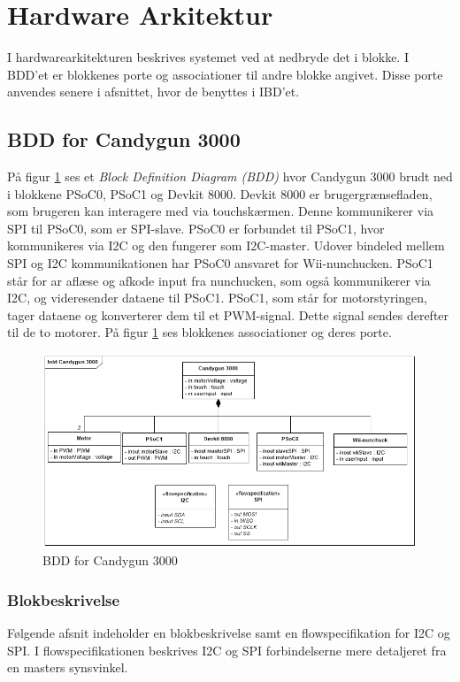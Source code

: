 \section{Hardware Arkitektur}
I hardwarearkitekturen beskrives systemet ved at nedbryde det i blokke. I BDD'et er blokkenes porte og associationer til andre blokke angivet. Disse porte anvendes senere i afsnittet, hvor de benyttes i IBD'et.

\subsection{BDD for Candygun 3000}
På figur \ref{fig:BDD} ses et \textit{Block Definition Diagram (BDD)} hvor Candygun 3000 brudt ned i blokkene PSoC0, PSoC1 og Devkit 8000. Devkit 8000 er brugergrænsefladen, som brugeren kan interagere med via touchskærmen. Denne kommunikerer via SPI til PSoC0, som er SPI-slave. PSoC0 er forbundet til PSoC1, hvor kommunikeres via I2C og den fungerer som I2C-master. Udover bindeled mellem SPI og I2C kommunikationen har  PSoC0 ansvaret for Wii-nunchucken. PSoC1 står for ar aflæse og afkode input fra nunchucken, som også kommunikerer via I2C, og videresender dataene til PSoC1. PSoC1, som står for motorstyringen, tager dataene og konverterer dem til et PWM-signal. Dette signal sendes derefter til de to motorer. På figur \ref{fig:BDD} ses blokkenes associationer og deres porte.  

\begin{figure}[H]
	\centering
	\includegraphics[width= \textwidth]{Systemarkitektur/images/BDD_overordnet.png}
	\caption{BDD for Candygun 3000}
	\label{fig:BDD}
\end{figure}


\subsubsection{Blokbeskrivelse}
Følgende afsnit indeholder en blokbeskrivelse samt en flowspecifikation for I2C og SPI. I flowspecifikationen beskrives I2C og SPI forbindelserne mere detaljeret fra en masters synsvinkel. \newline

